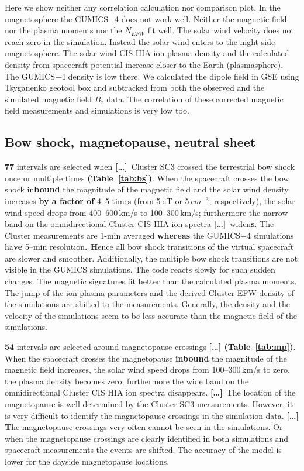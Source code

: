 \documentclass[linenumbers,draft]{agujournal}
\newcommand{\del}{\textbf{[\dots]}\ } %
\begin{document}
Here we show neither any correlation calculation nor comparison plot. In the magnetosphere the GUMICS$-$4 does not work well. Neither the magnetic field nor the plasma moments nor the $N_{EFW}$ fit well. The solar wind velocity does not reach zero in the simulation. Instead the solar wind enters to the night side magnetosphere. The solar wind CIS HIA ion plasma density and the calculated density from spacecraft potential increase closer to the Earth (plasmasphere). The GUMICS$-$4 density is low there. We calculated the dipole field in GSE using Tsyganenko geotool box \citep{tsyganenko95:_model_earth} and subtracked from both the observed and the simulated magnetic field $B_z$ data. The correlation of these corrected magnetic field measurements and simulations is very low too. 

\subsection{Bow shock, magnetopause, neutral sheet}
\label{sec:bs}

\textbf{77} intervals are selected when \del Cluster SC3 crossed the terrestrial bow shock once or multiple times \textbf{(Table~\ref{tab:bs})}. When the spacecraft crosses the bow shock in\textbf{bound} the magnitude of the magnetic field and the solar wind density increases \textbf{by a factor of} 4--5 times (from 5\,nT or 5\,$cm^{-3}$, respectively), the solar wind speed drops from 400--600\,km/s to 100--300\,km/s; furthermore the narrow band on the omnidirectional Cluster CIS HIA ion spectra \del widen\textbf{s}. The Cluster measurements are 1-min averaged \textbf{whereas} the GUMICS$-$4 simulations ha\textbf{ve} 5--min resolution\textbf{. H}ence all bow shock transitions of the virtual spacecraft are slower and smoother. Additionally, the multiple bow shock transitions are not visible in the $\mathrm{GUMICS}$ simulations. The code reacts slowly for such sudden changes. The magnetic signatures fit better than the calculated plasma moments. The jump of the ion plasma parameters and the derived Cluster EFW density of the simulations are shifted to the measurements. Generally, the density and the velocity of the simulations seem to be less accurate than the magnetic field of the simulations.

\textbf{54} intervals are selected around magnetopause crossings \textbf{[\dots] (Table~\ref{tab:mp})}. When the spacecraft crosses the magnetopause \textbf{inbound} the magnitude of the magnetic field increases, the solar wind speed drops from 100--300\,km/s to zero, the plasma density becomes zero; furthermore the wide band on the omnidirectional Cluster CIS HIA ion spectra disappears. \del The location of the magnetopause is well determined by the Cluster SC3 measurements. However, it is very difficult to identify the magnetopause crossings in the simulation data. \textbf{[\dots] T}he magnetopause crossings very often cannot be seen in the simulations. Or when the magnetopause crossings are clearly identified in both simulations and spacecraft measurements the events are shifted. The accuracy of the model is lower for the dayside magnetopause locations. 
\end{document}
